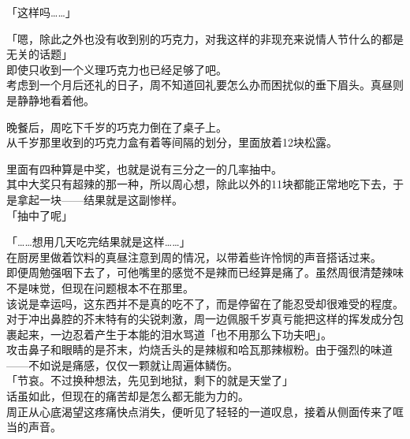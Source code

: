 「这样吗……」

「嗯，除此之外也没有收到别的巧克力，对我这样的非现充来说情人节什么的都是无关的话题」\\

即使只收到一个义理巧克力也已经足够了吧。\\

考虑到一个月后还礼的日子，周不知道回礼要怎么办而困扰似的垂下眉头。真昼则是静静地看着他。\\

\vspace{2\baselineskip}

晚餐后，周吃下千岁的巧克力倒在了桌子上。\\

从千岁那里收到的巧克力盒有着等间隔的划分，里面放着12块松露。

里面有四种算是中奖，也就是说有三分之一的几率抽中。\\

其中大奖只有超辣的那一种，所以周心想，除此以外的11块都能正常地吃下去，于是拿起一块——结果就是这副惨样。\\

「抽中了呢」

「……想用几天吃完结果就是这样……」\\

在厨房里做着饮料的真昼注意到周的情况，以带着些许怜悯的声音搭话过来。\\

即便周勉强咽下去了，可他嘴里的感觉不是辣而已经算是痛了。虽然周很清楚辣味不是味觉，但现在问题根本不在那里。\\

该说是幸运吗，这东西并不是真的吃不了，而是停留在了能忍受却很难受的程度。\\

对于冲出鼻腔的芥末特有的尖锐刺激，周一边佩服千岁真亏能把这样的挥发成分包裹起来，一边忍着产生于本能的泪水骂道「也不用那么下功夫吧」。\\

攻击鼻子和眼睛的是芥末，灼烧舌头的是辣椒和哈瓦那辣椒粉。由于强烈的味道——不如说是痛感，仅仅一颗就让周遍体鳞伤。\\

「节哀。不过换种想法，先见到地狱，剩下的就是天堂了」\\

话虽如此，但现在的痛苦却是怎么都无能为力的。\\

周正从心底渴望这疼痛快点消失，便听见了轻轻的一道叹息，接着从侧面传来了哐当的声音。\\


